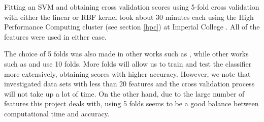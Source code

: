 \documentclass[12pt, twoside, a4paper]{report}
\begin{document}
Fitting an SVM and obtaining cross validation scores using 5-fold cross validation with either the linear or RBF kernel took about 30 minutes each using the High Performance Computing cluster (see section \ref{hpc}) at Imperial College \cite{RefWorks:218}. All of the features were used in either case.

The choice of 5 folds was also made in other works such as \cite{RefWorks:187}, while other works such as \cite{RefWorks:202} and \cite{RefWorks:212} use 10 folds. More folds will allow us to train and test the classifier more extensively, obtaining scores with higher accuracy. However, we note that \cite{RefWorks:202} investigated data sets with less than 20 features and the cross validation process will not take up a lot of time. On the other hand, due to the large number of features this project deals with, using 5 folds seems to be a good balance between computational time and accuracy.
\end{document}
